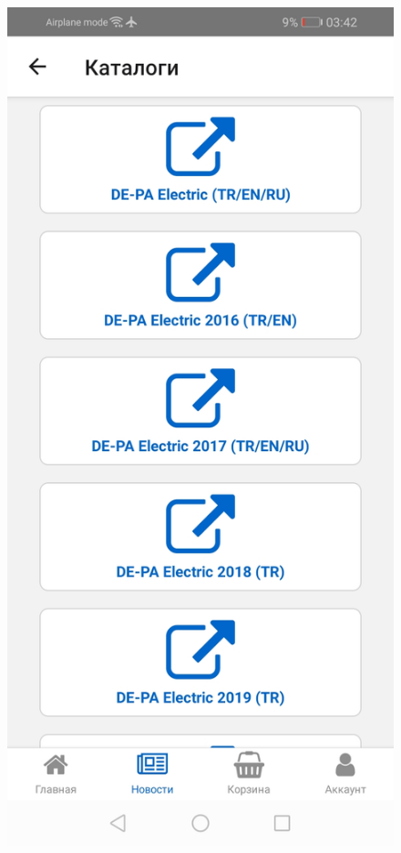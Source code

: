 \begin{figure}[!p]
\begin{minipage}{0.19\textwidth}
        \includegraphics[width=.99\linewidth]
        {images/android/article-catalogs.jpg}
    \end{minipage}
    \begin{minipage}{0.19\textwidth}
        \centering


\end{minipage}
\end{figure}
